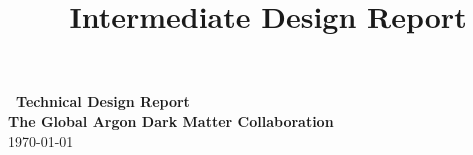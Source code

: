 \documentclass[aps,superscriptaddress,floatfix,nofootinbib,showpacs,amsmath,amssymb,altaffilletter,floatfix,11pt]{revtex4-1}
\begin{document}
\setlength{\parindent}{1em}
\setdefaultleftmargin{1em}{1em}{}{}{}{}
\setcounter{page}{0}\thispagestyle{empty}
\onecolumngrid
\begin{center}
{\bf \LARGE \DSk\ Technical Design Report}\\
\vspace{.5in}
{\bf \Large The Global Argon Dark Matter Collaboration}\\
\vspace{.5in}
\today
\end{center}
\vspace{.2in}
%
\clearpage
\newpage
{}
\title{\DSk\ Intermediate Design Report}

\maketitle
\clearpage
\onecolumngrid
\setcounter{tocdepth}{2}
\tableofcontents
\makeatletter
\let\toc@pre\relax
\let\toc@post\relax
\makeatother
\clearpage
\listoffigures
\clearpage
\listoftables
\clearpage
\newpage
{}
\clearpage
\onecolumngrid
\newpage
{}
\clearpage



  

  
  
  



 







\end{document}
